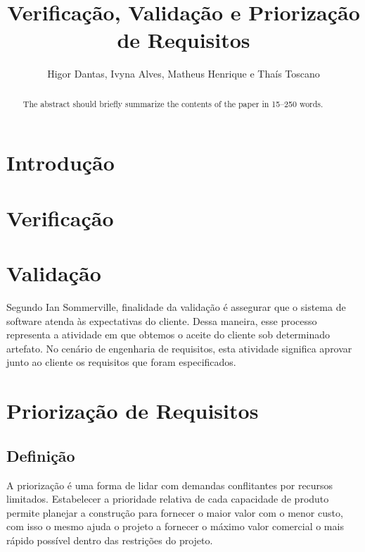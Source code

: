\documentclass[runningheads]{llncs}
\begin{document}
%
\title{Verificação, Validação e Priorização de Requisitos}
%
\author{Higor Dantas,
Ivyna Alves, Matheus Henrique e
Thaís Toscano}
%
%
%
\maketitle              %
%
\begin{abstract}
The abstract should briefly summarize the contents of the paper in
15--250 words.

\end{abstract}
%
%
%
\section{Introdução}

\section{Verificação}

\section{Validação}
Segundo Ian Sommerville, finalidade da validação é assegurar que o sistema de software atenda às expectativas do cliente. Dessa maneira, esse processo representa a atividade em que obtemos o aceite do cliente sob determinado artefato. No cenário de engenharia de requisitos, esta atividade significa aprovar junto ao cliente os requisitos que foram especificados.


\section{Priorização de Requisitos}

\subsection{Definição}
A priorização é uma forma de lidar com demandas conflitantes por recursos limitados. Estabelecer a prioridade relativa de cada capacidade de produto permite planejar a construção para fornecer o maior valor com o menor custo, com isso o mesmo ajuda o projeto a fornecer o máximo valor comercial o mais rápido possível dentro das restrições do projeto.
\end{document}
